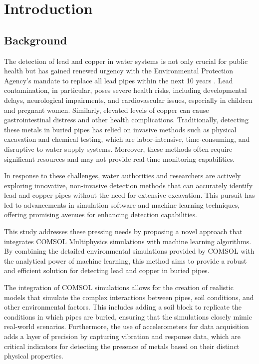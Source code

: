 

\chapter{Introduction}

\section{Background}
\label{sec:testbib}

The detection of lead and copper in water systems is not only crucial for public health but has gained renewed urgency with the
Environmental Protection Agency's mandate to replace all lead pipes within the next 10 years \cite{epa_lead_2023}. Lead contamination, in
particular, poses severe health risks, including developmental delays, neurological impairments, and cardiovascular issues, especially in children and pregnant women. Similarly, elevated levels of copper can cause gastrointestinal distress and other health complications.
Traditionally, detecting these metals in buried pipes has relied on invasive methods such as
physical excavation and chemical testing, which are labor-intensive, time-consuming, and disruptive to water supply systems. Moreover, these methods often require significant resources and may not provide real-time monitoring capabilities.

In response to these challenges, water authorities and researchers are actively exploring innovative, non-invasive detection methods that can accurately identify lead and copper pipes without the need for extensive excavation. This pursuit has led to advancements in simulation software and machine learning techniques, offering promising avenues for enhancing detection capabilities.

This study addresses these pressing needs by proposing a novel approach that integrates COMSOL Multiphysics simulations with machine learning algorithms. By combining the detailed environmental simulations provided by COMSOL with the analytical power of machine learning, this method aims to provide a robust and efficient solution for detecting lead and copper in buried pipes.

The integration of COMSOL simulations allows for the creation of realistic models that simulate the complex interactions between pipes, soil conditions, and other environmental factors. This includes adding a soil block to replicate the conditions in which pipes are buried, ensuring that the simulations closely mimic real-world scenarios. Furthermore, the use of accelerometers for data acquisition adds a layer of precision by capturing vibration and response data, which are critical indicators for detecting the presence of metals based on their distinct physical properties.

